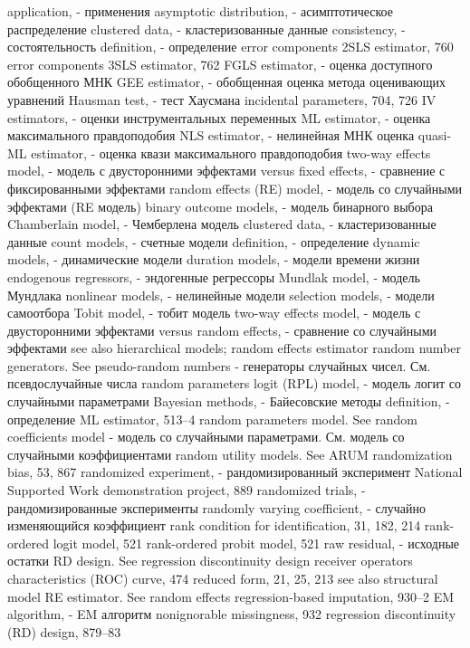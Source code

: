 application, - применения
asymptotic distribution, - асимптотическое распределение
clustered data, - кластеризованные данные
consistency, - состоятельность
definition, - определение
error components 2SLS estimator, 760 error components 3SLS estimator, 762 
FGLS estimator, -  оценка доступного обобщенного МНК
GEE estimator, - обобщенная оценка метода оценивающих уравнений 
Hausman test, - тест Хаусмана
incidental parameters, 704, 726
IV estimators, - оценки инструментальных переменных
ML estimator, - оценка максимального правдоподобия
NLS estimator, - нелинейная МНК оценка
quasi-ML estimator, - оценка квази максимального правдоподобия
two-way effects model, - модель с двусторонними эффектами
versus fixed effects, - сравнение с фиксированными эффектами
random effects (RE) model, - модель со случайными эффектами (RE модель)
binary outcome models, - модель бинарного выбора
Chamberlain model, - Чемберлена модель
clustered data, - кластеризованные данные
count models, - счетные модели 
definition, - определение
dynamic models, - динамические модели
duration models, - модели времени жизни
endogenous regressors, - эндогенные регрессоры
Mundlak model, - модель Мундлака
nonlinear models, - нелинейные модели
selection models, - модели самоотбора
Tobit model, - тобит модель 
two-way effects model, - модель с двусторонними эффектами
versus random effects, - сравнение со случайными эффектами
see also hierarchical models; random effects
estimator
random number generators. See pseudo-random numbers - генераторы случайных чисел. См. псевдослучайные числа
random parameters logit (RPL) model, - модель логит со случайными параметрами
Bayesian methods, - Байесовские методы
definition, - определение
ML estimator, 513–4
random parameters model. See random coefficients model - модель со случайными параметрами. См. модель со случайными коэффициентами
random utility models. See ARUM randomization bias, 53, 867 
randomized experiment, - рандомизированный эксперимент
National Supported Work demonstration project, 889
randomized trials, - рандомизированные эксперименты
randomly varying coefficient, - случайно изменяющийся коэффициент
rank condition for identification, 31, 182, 214 rank-ordered logit model, 521
rank-ordered probit model, 521
raw residual, - исходные остатки
RD design. See regression discontinuity design receiver operators characteristics (ROC) curve, 474 reduced form, 21, 25, 213
see also structural model
RE estimator. See random effects regression-based imputation, 930–2
EM algorithm, - EM алгоритм
nonignorable missingness, 932
regression discontinuity (RD) design, 879–83
